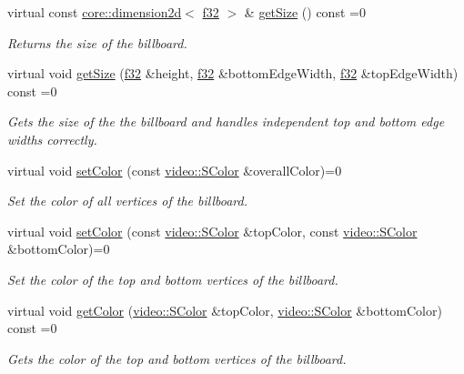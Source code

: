 \begin{DoxyCompactItemize}
virtual const \hyperlink{classirr_1_1core_1_1dimension2d}{core\+::dimension2d}$<$ \hyperlink{namespaceirr_a0277be98d67dc26ff93b1a6a1d086b07}{f32} $>$ \& \hyperlink{classirr_1_1scene_1_1IBillboardSceneNode_a466cfd24ccb0fb6c2216dbdc7228e3c0}{get\+Size} () const =0
\begin{DoxyCompactList}\small\item\em Returns the size of the billboard. \end{DoxyCompactList}\item 
virtual void \hyperlink{classirr_1_1scene_1_1IBillboardSceneNode_a79a636a0da637eaa9c061138f5ef3f68}{get\+Size} (\hyperlink{namespaceirr_a0277be98d67dc26ff93b1a6a1d086b07}{f32} \&height, \hyperlink{namespaceirr_a0277be98d67dc26ff93b1a6a1d086b07}{f32} \&bottom\+Edge\+Width, \hyperlink{namespaceirr_a0277be98d67dc26ff93b1a6a1d086b07}{f32} \&top\+Edge\+Width) const =0
\begin{DoxyCompactList}\small\item\em Gets the size of the the billboard and handles independent top and bottom edge widths correctly. \end{DoxyCompactList}\item 
virtual void \hyperlink{classirr_1_1scene_1_1IBillboardSceneNode_a82c1038a6dfcd255863baa96aaba4182}{set\+Color} (const \hyperlink{classirr_1_1video_1_1SColor}{video\+::\+S\+Color} \&overall\+Color)=0
\begin{DoxyCompactList}\small\item\em Set the color of all vertices of the billboard. \end{DoxyCompactList}\item 
virtual void \hyperlink{classirr_1_1scene_1_1IBillboardSceneNode_a13efdfa73998706baf10cedcdb48d559}{set\+Color} (const \hyperlink{classirr_1_1video_1_1SColor}{video\+::\+S\+Color} \&top\+Color, const \hyperlink{classirr_1_1video_1_1SColor}{video\+::\+S\+Color} \&bottom\+Color)=0
\begin{DoxyCompactList}\small\item\em Set the color of the top and bottom vertices of the billboard. \end{DoxyCompactList}\item 
virtual void \hyperlink{classirr_1_1scene_1_1IBillboardSceneNode_a0b2729cc4913b0890ae28cf0ef0ab949}{get\+Color} (\hyperlink{classirr_1_1video_1_1SColor}{video\+::\+S\+Color} \&top\+Color, \hyperlink{classirr_1_1video_1_1SColor}{video\+::\+S\+Color} \&bottom\+Color) const =0
\begin{DoxyCompactList}\small\item\em Gets the color of the top and bottom vertices of the billboard. \end{DoxyCompactList}\end{DoxyCompactItemize}

